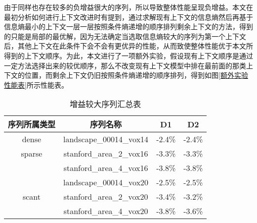 \documentclass[bachelor,print,msfonts]{xduthesis}
\begin{document}
由于同样也存在较多的负增益很大的序列，所以导致整体性能呈现负增益。本文在最初分析如何进行上下文改进时有提到，通过求解现有上下文的信息熵然后再基于信息熵最小的上下文一层一层按照条件熵递增的顺序排列剩余上下文的方法，得到的只能是局部的最优解，因为无法确定当选取信息熵较大的序列为第一个上下文后，其他上下文在此条件下会不会有更优异的性能，从而致使整体性能优于本文所得到的上下文顺序。为此，本文进行了一项额外实验，假设现有上下文顺序是通过一定方法选择出来的较优顺序，那么不改变现有上下文模型中排在最前面的那类上下文的位置，而剩余上下文仍旧按照条件熵递增的顺序排列，得到如图\ref{额外实验性能表}所示性能表。
\begin{table}[h]
    \fontsize{10.5pt}{15pt}\selectfont
    \centering
    \caption{\label{有增益序列} 增益较大序列汇总表}
    \begin{tabular}{cccc}
        \toprule
        序列所属类型 & 序列名称                 & D1     & D2     \\
        \midrule
        dense        & landscape\_00014\_vox14  & -2.4\% & -2.4\% \\
        \midrule
        sparse       & stanford\_area\_2\_vox16 & -3.3\% & -3.3\% \\
                     & stanford\_area\_4\_vox16 & -3.8\% & -3.8\% \\
        \midrule
                     & landscape\_00014\_vox20  & -2.5\% & -2.5\% \\
        scant        & stanford\_area\_2\_vox20 & -3.4\% & -3.2\% \\
                     & stanford\_area\_4\_vox20 & -3.8\% & -3.6\% \\
        \bottomrule
    \end{tabular}
\end{table}
\end{document}
